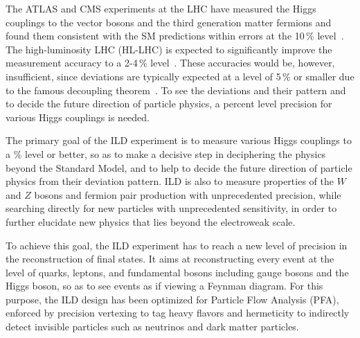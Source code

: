 The ATLAS and CMS experiments at the LHC have measured the Higgs couplings to the vector bosons and the third generation matter fermions and found them consistent with the SM predictions within errors at the 10\,\% level~\cite{Cepeda:2019klc}. The high-luminosity LHC (HL-LHC) is expected to significantly improve the measurement accuracy to a 2-4\,\% level~\cite{Cepeda:2019klc}. These accuracies would be, however, insufficient, since deviations are typically expected at a level of 5\,\% or smaller due to the famous decoupling theorem~\cite{Ref:Decoupling}. To see the deviations and their pattern and to decide the future direction of particle physics, a percent level precision for various Higgs couplings is needed.

The primary goal of the ILD experiment is to measure various Higgs couplings to a \% level or better, so as to make a decisive step in deciphering the physics beyond the Standard Model, and to help to 
decide the future direction of particle physics from their deviation pattern. ILD is also to measure properties of the $W$ and $Z$ bosons and fermion pair production with unprecedented precision, while searching directly for new particles with unprecedented sensitivity, in order to further elucidate new physics that lies beyond the electroweak scale.

To achieve this goal, the ILD experiment has to reach a new level of precision in the reconstruction of final states. It aims at reconstructing every event at the level of quarks, leptons, and fundamental bosons including gauge bosons and the Higgs boson, so as to see events as if viewing a Feynman diagram. For this purpose, the ILD design has been optimized for Particle Flow Analysis (PFA), enforced by precision vertexing to tag heavy flavors and hermeticity to indirectly detect invisible particles such as neutrinos and dark matter particles. 

